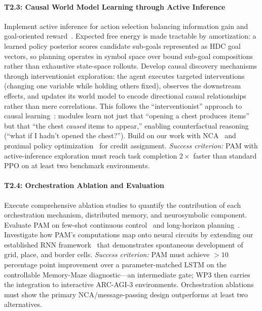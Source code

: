 \paragraph{T2.3: Causal World Model Learning through Active Inference}
Implement active inference for action selection balancing information gain and goal-oriented reward~\cite{friston2010free,rao2023active}. Expected free energy is made tractable by amortization: a learned policy posterior scores candidate sub-goals represented as HDC goal vectors, so planning operates in symbol space over bound sub-goal compositions rather than exhaustive state-space rollouts. Develop causal discovery mechanisms through interventionist exploration: the agent executes targeted interventions (changing one variable while holding others fixed), observes the downstream effects, and updates its world model to encode directional causal relationships rather than mere correlations. This follows the ``interventionist'' approach to causal learning~\cite{scholkopf2021causal}: modules learn not just that ``opening a chest produces items'' but that ``the chest \textit{caused} items to appear,'' enabling counterfactual reasoning (``what if I hadn't opened the chest?''). Build on our work with NCA~\cite{kvalsund2026sensor} and proximal policy optimization~\cite{schulman2017ppo} for credit assignment.
\textit{Success criterion:} PAM with active-inference exploration must reach task completion $2{\times}$ faster than standard PPO on at least two benchmark environments.

\paragraph{T2.4: Orchestration Ablation and Evaluation}
Execute comprehensive ablation studies to quantify the contribution of each orchestration mechanism, distributed memory, and neurosymbolic component. Evaluate PAM on few-shot continuous control~\cite{mete2024few,yu2019meta} and long-horizon planning~\cite{pasukonis2022evaluating}. Investigate how PAM's computations map onto neural circuits by extending our established RNN framework~\cite{schoyen2023coherently,pettersen2024elife,pettersen2024nips} that demonstrates spontaneous development of grid, place, and border cells.
\textit{Success criterion:} PAM must achieve ${>}10$ percentage point improvement over a parameter-matched LSTM on the controllable Memory-Maze diagnostic---an intermediate gate; WP3 then carries the integration to interactive ARC-AGI-3 environments. Orchestration ablations must show the primary NCA/message-passing design outperforms at least two alternatives.

